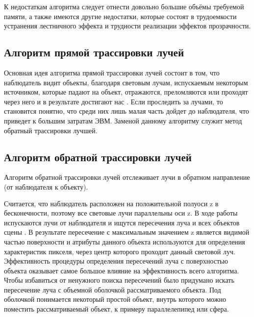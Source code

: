 К недостаткам алгоритма следует отнести довольно большие объёмы требуемой памяти, а также имеются другие недостатки, которые состоят в трудоемкости устранения лестничного эффекта и трудности реализации эффектов прозрачности.

\subsection{Алгоритм прямой трассировки лучей}

Основная идея алгоритма прямой трассировки лучей состоит в том, что наблюдатель видит объекты, благодаря световым лучам, испускаемым некоторым источником, которые падают на объект, отражаются, преломляются или проходят через него и в результате достигают нас \cite{bib5}. Если проследить за лучами, то становится понятно, что среди них лишь малая часть дойдет до наблюдателя, что приведет к большим затратам ЭВМ. Заменой данному алгоритму служит метод обратный трассировки лучшей.

\subsection{Алгоритм обратной трассировки лучей}

Алгоритм обратной трассировки лучей отслеживает лучи в обратном направление (от наблюдателя к объекту). 

Считается, что наблюдатель расположен на положительной полуоси z в бесконечности, поэтому все световые лучи параллельны оси z. В ходе работы испускаются лучи от наблюдателя и ищутся пересечения луча и всех объектов сцены \cite{bib5}. В результате пересечение с максимальным значением z является видимой частью поверхности и атрибуты данного объекта используются для определения характеристик пикселя, через центр которого проходит данный световой луч. Эффективность процедуры определения пересечений луча с поверхностью объекта оказывает самое большое влияние на эффективность всего алгоритма. Чтобы избавиться от ненужного поиска пересечений было придумано искать пересечение луча с объемной оболочкой рассматриваемого объекта. Под оболочкой понимается некоторый простой объект, внутрь которого можно поместить рассматриваемый объект, к примеру параллелепипед или сфера.

\begin{figure}[ht!]
\end{figure}

